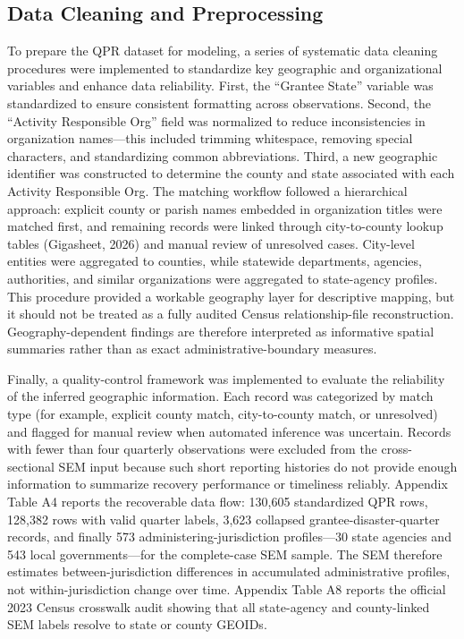 \documentclass[
  number]{elsarticle}
\begin{document}
\subsection{Data Cleaning and
Preprocessing}\label{data-cleaning-and-preprocessing}

To prepare the QPR dataset for modeling, a series of systematic data
cleaning procedures were implemented to standardize key geographic and
organizational variables and enhance data reliability. First, the
``Grantee State'' variable was standardized to ensure consistent
formatting across observations. Second, the ``Activity Responsible Org''
field was normalized to reduce inconsistencies in organization
names---this included trimming whitespace, removing special characters,
and standardizing common abbreviations. Third, a new geographic
identifier was constructed to determine the county and state associated
with each Activity Responsible Org. The matching workflow followed a
hierarchical approach: explicit county or parish names embedded in
organization titles were matched first, and remaining records were
linked through city-to-county lookup tables (Gigasheet, 2026) and manual
review of unresolved cases. City-level entities were aggregated to
counties, while statewide departments, agencies, authorities, and
similar organizations were aggregated to state-agency profiles. This
procedure provided a workable geography layer for descriptive mapping,
but it should not be treated as a fully audited Census relationship-file
reconstruction. Geography-dependent findings are therefore interpreted
as informative spatial summaries rather than as exact
administrative-boundary measures.

Finally, a quality-control framework was implemented to evaluate the
reliability of the inferred geographic information. Each record was
categorized by match type (for example, explicit county match,
city-to-county match, or unresolved) and flagged for manual review when
automated inference was uncertain. Records with fewer than four
quarterly observations were excluded from the cross-sectional SEM input
because such short reporting histories do not provide enough information
to summarize recovery performance or timeliness reliably. Appendix Table
A4 reports the recoverable data flow: 130,605 standardized QPR rows,
128,382 rows with valid quarter labels, 3,623 collapsed
grantee-disaster-quarter records, and finally 573
administering-jurisdiction profiles---30 state agencies and 543 local
governments---for the complete-case SEM sample. The SEM therefore
estimates between-jurisdiction differences in accumulated administrative
profiles, not within-jurisdiction change over time. Appendix Table A8
reports the official 2023 Census crosswalk audit showing that all
state-agency and county-linked SEM labels resolve to state or county
GEOIDs.
\end{document}
